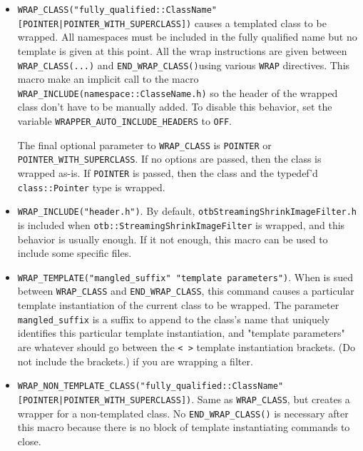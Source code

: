 \begin{itemize}
  
\item \verb$WRAP_CLASS("fully_qualified::ClassName" [POINTER|POINTER_WITH_SUPERCLASS])$
  causes a templated class to be wrapped. All namespaces must be 
  included in the fully qualified name but no template is given 
  at this point. All the wrap instructions are given between 
  \verb$WRAP_CLASS(...)$ and \verb$END_WRAP_CLASS()$using various \verb$WRAP$ directives. 
  This macro make an implicit call to the macro \verb$WRAP_INCLUDE(namespace::ClasseName.h)$ so the 
  header of the wrapped class don't have to be manually added. To disable this behavior, 
  set the variable \verb$WRAPPER_AUTO_INCLUDE_HEADERS$ to \verb$OFF$.
  
  The final optional parameter to \verb$WRAP_CLASS$ is \verb$POINTER$ or
  \verb$POINTER_WITH_SUPERCLASS$. If no options are passed, then the class is wrapped
  as-is. If \verb$POINTER$ is passed, then the class and the typedef'd 
  \verb$class::Pointer$ type is wrapped.

\item \verb$WRAP_INCLUDE("header.h")$. By default, 
  \verb$otbStreamingShrinkImageFilter.h$ is included
  when \verb$otb::StreamingShrinkImageFilter$ is wrapped, and this behavior is usually
  enough. If it not enough, this macro can be used to include some specific files.
  
\item \verb$WRAP_TEMPLATE("mangled_suffix" "template parameters")$. When is sued between 
  \verb$WRAP_CLASS$ and \verb$END_WRAP_CLASS$, this command causes a particular template 
  instantiation of the current class to be wrapped. The parameter \verb$mangled_suffix$ is a suffix to
  append to the class's name that uniquely identifies this particular template
  instantiation, and "template parameters" are whatever should go between the \verb$< >$
  template instantiation brackets. (Do not include the brackets.) if you are
  wrapping a filter.

\item \verb$WRAP_NON_TEMPLATE_CLASS("fully_qualified::ClassName"$\\\verb$[POINTER|POINTER_WITH_SUPERCLASS])$.
  Same as \verb$WRAP_CLASS$, but creates a wrapper
  for a non-templated class. No \verb$END_WRAP_CLASS()$ is necessary after this macro
  because there is no block of template instantiating commands to close.
  
\end{itemize}


